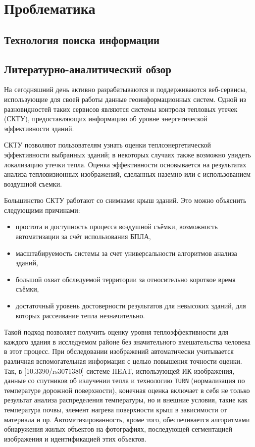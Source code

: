 \chapter{Проблематика}

\section{Технология поиска информации}

\section{Литературно-аналитический обзор}

\par
	На сегодняшний день активно разрабатываются и поддерживаются веб-сервисы, использующие для своей работы данные геоинформационных систем. Одной из разновидностей таких сервисов являются системы контроля тепловых утечек (СКТУ), предоставляющих информацию об уровне энергетической эффективности зданий.

	СКТУ позволяют пользователям узнать оценки теплоэнергетической эффективности выбранных зданий; в некоторых случаях также возможно увидеть локализацию утечки тепла. Оценка эффективности основывается на результатах анализа тепловизионных изображений, сделанных наземно или с использованием воздушной съемки.
	
	Большинство СКТУ работают со снимками крыш зданий. Это можно объяснить следующими причинами:
	\begin{itemize}
		\item простота и доступность процесса воздушной съёмки, возможность автоматизации за счёт использования БПЛА,
		\item масштабируемость системы за счет универсальности алгоритмов анализа зданий,
		\item большой охват обследуемой территории за относительно короткое время съёмки,
		\item достаточный уровень достоверности результатов для невысоких зданий, для которых рассеивание тепла незначительно.		
	\end{itemize}

	Такой подход позволяет получить оценку уровня теплоэффективности для каждого здания в исследуемом районе без значительного вмешательства человека в этот процесс. При обследовании изображений автоматически учитывается различная вспомогательная информация с целью повышения точности оценки. Так, в [10.3390/rs3071380] системе HEAT, использующей ИК-изображения, данные со спутников об излучении тепла и технологию \texttt{TURN} (нормализация по температуре дорожной поверхности), конечная оценка включает в себя не только результат анализа распределения температуры, но и внешние условия, такие как температура почвы, элемент нагрева поверхности крыш в зависимости от материала и пр. Автоматизированность, кроме того, обеспечивается алгоритмами обнаружения жилых объектов на фотографиях, последующей сегментацией изображения и идентификацией этих объектов.

